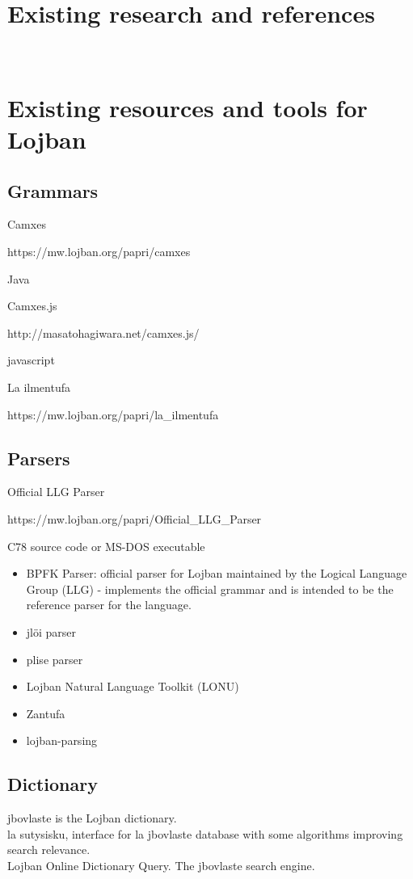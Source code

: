\chapter{Existing research and references}

\newpage \thispagestyle{empty} \ \newpage

\chapter{Existing resources and tools for Lojban}

\vspace{0.5cm}

\section{Grammars}
\label{section:lojban-grammars}

Camxes

https://mw.lojban.org/papri/camxes

Java

Camxes.js

http://masatohagiwara.net/camxes.js/

javascript

La ilmentufa

https://mw.lojban.org/papri/la\_ilmentufa


\section{Parsers}

Official LLG Parser

https://mw.lojban.org/papri/Official\_LLG\_Parser

C78 source code
or
MS-DOS executable

\begin{itemize}
    \item BPFK Parser: official parser for Lojban maintained by the Logical Language Group (LLG) - implements the official grammar and is intended to be the reference parser for the language.
    \item jlöi parser
    \item plise parser
    \item Lojban Natural Language Toolkit (LONU)
    \item Zantufa
    \item lojban-parsing
\end{itemize}

\section{Dictionary}
\label{sec:dictionary}

jbovlaste is the Lojban dictionary. \\

la sutysisku, interface for la jbovlaste database with some algorithms improving search relevance. \\

Lojban Online Dictionary Query. The jbovlaste search engine.\\